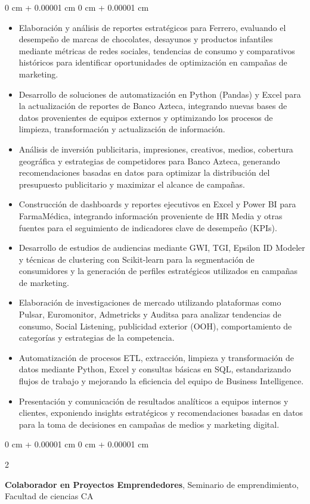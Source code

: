 \documentclass[10pt, letterpaper]{article}
\newenvironment{highlights}{
    \begin{itemize}[
        topsep=0.10 cm,
        parsep=0.10 cm,
        partopsep=0pt,
        itemsep=0pt,
        leftmargin=0 cm + 10pt
    ]
}{
    \end{itemize}
} %
\newenvironment{onecolentry}{
    \begin{adjustwidth}{
        0 cm + 0.00001 cm
    }{
        0 cm + 0.00001 cm
    }
}{
    \end{adjustwidth}
} %
\newenvironment{twocolentry}[2][]{
    \onecolentry
    \def\secondColumn{#2}
    \setcolumnwidth{\fill, 4.5 cm}
    \begin{paracol}{2}
}{
    \switchcolumn \raggedleft \secondColumn
    \end{paracol}
    \endonecolentry
} %
\begin{document}
\begin{onecolentry}
    \begin{highlights}
        \item Elaboración y análisis de reportes estratégicos para Ferrero, evaluando el desempeño de marcas de chocolates, desayunos y productos infantiles mediante métricas de redes sociales, tendencias de consumo y comparativos históricos para identificar oportunidades de optimización en campañas de marketing.

        \item Desarrollo de soluciones de automatización en Python (Pandas) y Excel para la actualización de reportes de Banco Azteca, integrando nuevas bases de datos provenientes de equipos externos y optimizando los procesos de limpieza, transformación y actualización de información.

        \item Análisis de inversión publicitaria, impresiones, creativos, medios, cobertura geográfica y estrategias de competidores para Banco Azteca, generando recomendaciones basadas en datos para optimizar la distribución del presupuesto publicitario y maximizar el alcance de campañas.

        \item Construcción de dashboards y reportes ejecutivos en Excel y Power BI para FarmaMédica, integrando información proveniente de HR Media y otras fuentes para el seguimiento de indicadores clave de desempeño (KPIs).

        \item Desarrollo de estudios de audiencias mediante GWI, TGI, Epsilon ID Modeler y técnicas de clustering con Scikit-learn para la segmentación de consumidores y la generación de perfiles estratégicos utilizados en campañas de marketing.

        \item Elaboración de investigaciones de mercado utilizando plataformas como Pulsar, Euromonitor, Admetricks y Auditsa para analizar tendencias de consumo, Social Listening, publicidad exterior (OOH), comportamiento de categorías y estrategias de la competencia.

        \item Automatización de procesos ETL, extracción, limpieza y transformación de datos mediante Python, Excel y consultas básicas en SQL, estandarizando flujos de trabajo y mejorando la eficiencia del equipo de Business Intelligence.

        \item Presentación y comunicación de resultados analíticos a equipos internos y clientes, exponiendo insights estratégicos y recomendaciones basadas en datos para la toma de decisiones en campañas de medios y marketing digital.
    \end{highlights}
\end{onecolentry}
        \begin{twocolentry}{
            2025
        }
            \textbf{Colaborador en Proyectos Emprendedores}, Seminario de emprendimiento, Facultad de ciencias CA\end{twocolentry}
\end{document}
